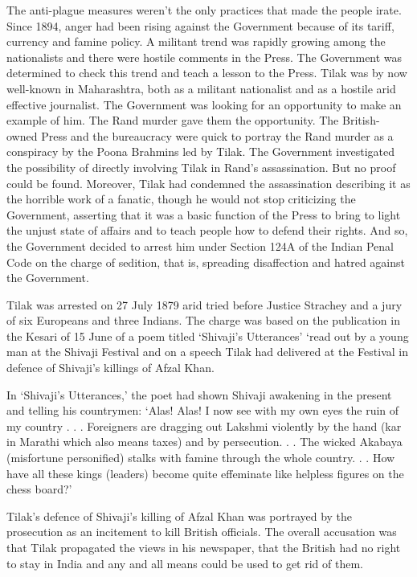 The anti-plague measures weren’t the only practices that made the people irate. Since 1894, anger had been rising against the Government because of its tariff, currency and famine policy. A militant trend was rapidly growing among the nationalists and there were hostile comments in the Press. The Government was determined to check this trend and teach a lesson to the Press. Tilak was by now well-known in Maharashtra, both as a militant nationalist and as a hostile arid effective journalist. The Government was looking for an opportunity to make an example of him. The Rand murder gave them the opportunity. The British- owned Press and the bureaucracy were quick to portray the Rand murder as a conspiracy by the Poona Brahmins led by Tilak. The Government investigated the possibility of directly involving Tilak in Rand’s assassination. But no proof could be found. Moreover, Tilak had condemned the assassination describing it as the horrible work of a fanatic, though he would not stop criticizing the Government, asserting that it was a basic function of the Press to bring to light the unjust state of affairs and to teach people how to defend their rights. And so, the Government decided to arrest him under Section 124A of the Indian Penal Code on the charge of sedition, that is, spreading disaffection and hatred against the Government.

Tilak was arrested on 27 July 1879 arid tried before Justice Strachey and a jury of six Europeans and three Indians. The charge was based on the publication in the Kesari of 15 June of a poem titled ‘Shivaji’s Utterances’ ‘read out by a young man at the Shivaji Festival and on a speech Tilak had delivered at the Festival in defence of Shivaji’s killings of Afzal Khan.

In ‘Shivaji’s Utterances,’ the poet had shown Shivaji awakening in the present and telling his countrymen: ‘Alas! Alas! I now see with my own eyes the ruin of my country . . . Foreigners are dragging out Lakshmi violently by the hand (kar in Marathi which also means taxes) and by persecution. . . The wicked Akabaya (misfortune personified) stalks with famine through the whole country. . . How have all these kings (leaders) become quite effeminate like helpless figures on the chess­ board?’

Tilak’s defence of Shivaji’s killing of Afzal Khan was portrayed by the prosecution as an incitement to kill British officials. The overall accusation was that Tilak propagated the views in his newspaper, that the British had no right to stay in India and any and all means could be used to get rid of them.

